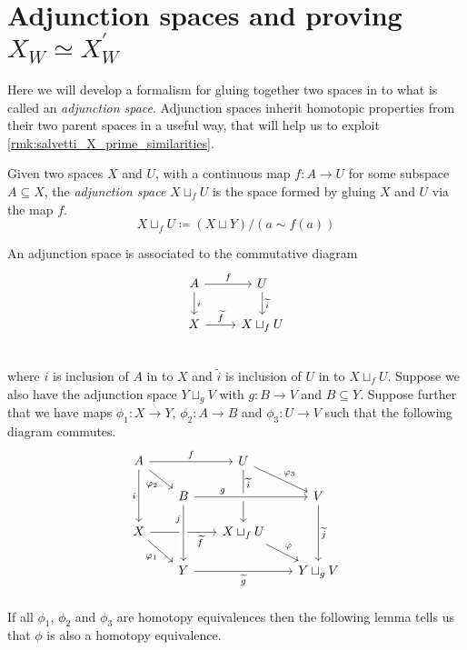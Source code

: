 \documentclass[class=article, crop=false]{standalone}
\begin{document}
\section{Adjunction spaces and proving \texorpdfstring{$X_W \simeq X^\prime_W$}{X W homotopy equiv. to X prime W}}
\label{sec:adj_hom_equiv}

Here we will develop a formalism for gluing together two spaces in to what is called an \emph{adjunction space}. Adjunction spaces inherit homotopic properties from their two parent spaces in a useful way, that will help us to exploit \cref{rmk:salvetti_X_prime_similarities}.

\begin{definition}
    Given two spaces $X$ and $U$, with a continuous map $f \colon A \to U$ for some subspace $A \subseteq X$, the \emph{adjunction space} $ X \sqcup_f U$  is the space formed by gluing $X$ and $U$ via the map $f$.
    \begin{equation*}
        X \sqcup_f U \coloneq (X \sqcup Y)/(a \sim f(a))
    \end{equation*}
\end{definition}

An adjunction space is associated to the commutative diagram
\begin{equation}
    \begin{tikzcd}
            A \ar[r, "f" ] \ar[d, "i"]  &   U  \ar[d, "\widetilde{i}"]    \\
            X \ar[r, "\widetilde{f}"]         &   X \sqcup_f U            \\
    \end{tikzcd}
\label{eqn:adjunction_diagram}
\end{equation}
where $i$ is inclusion of $A$ in to $X$ and $\widetilde{i}$ is inclusion of $U$ in to $X \sqcup_f U $. Suppose we also have the adjunction space $Y \sqcup_g V$ with $g \colon B \to V$ and $B\subseteq Y$. Suppose further that we have maps $ \phi_1 \colon X \to Y$, $\phi_2 \colon A \to B$ and $\phi_3 \colon U \to V$ such that the following diagram commutes.
\begin{equation}
    \begin{tikzcd}[row sep=scriptsize, column sep=scriptsize]
        A \ar[dr, "\phi_2"'] \ar[rr, "f"] \ar[dd, "i"'] & & U \ar[dr, "\phi_3"] \ar[dd, "\widetilde{i}", near start]  & \\
        &   B \ar[rr, crossing over, "g" near start] & & V \ar[dd, "\widetilde{j}"]                                     \\
        X \ar[dr, "\phi_1"'] \ar[rr, "\widetilde{f}"', near end] & & X \sqcup_f U \ar[dr, "\phi"] &                     \\
        &   Y \ar[rr, "\widetilde{g}"'] \ar[from=uu, crossing over, "j"', near start] & & Y\sqcup_gV                    \\
    \end{tikzcd}
    \label{eqn:adjunction_gluing_diagram}
\end{equation}
If all $\phi_1$, $\phi_2$ and $\phi_3$ are homotopy equivalences then the following lemma tells us that $\phi$ is also a homotopy equivalence.
\end{document}
